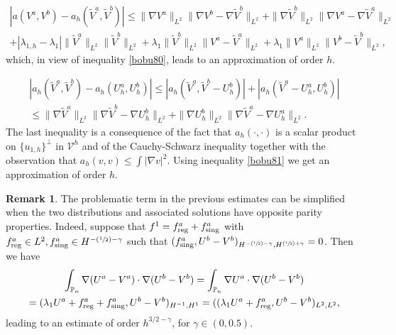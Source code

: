 \documentclass[JEP,XML,SOM,Unicode,ThmDefs,NoFloatCountersInSection,published]{cedram}
\newcommand{\Psfrac}[2]{(\sfrac{#1}{#2})}
\theoremstyle{plain}
\theoremstyle{definition}
\newtheorem{rem}[thm]{Remark}
\newcommand{\aaa}{a}
\newcommand{\bbb}{b}
\newcommand{\reg}{\textup{reg}}
\newcommand{\sing}{\textup{sing}}
\def\Pp{{\mathbb{P}_n}}
\newcommand{\lb}{\lambda}
\begin{document}
\vspace*{-1.8\baselineskip}
\begin{multline*}
|a(V^\aaa,V^\bbb)-a_h(\tilde V^\aaa, \tilde V^\bbb)| \le \|\nabla V^\aaa\|_{L^2} \|\nabla V^\bbb-\nabla \tilde V^\bbb\|_{L^2}+ \|\nabla \tilde V^\bbb\|_{L^2} \|\nabla V^\aaa-\nabla \tilde V^\aaa\|_{L^2}\\
+
|\lb_{1,h}-\lb_1| \|\tilde V^\aaa\|_{L^2}\|\tilde V^\bbb\|_{L^2}+ \lb_1 \|\tilde V^\bbb\|_{L^2} \| V^\aaa- \tilde V^\aaa\|_{L^2}+\lb_1 \|V^\aaa\|_{L^2} \| V^\bbb-\tilde V^\bbb\|_{L^2},
\end{multline*}
which, in view of inequality \eqref{bobu80}, leads to an approximation of order $h$.

\vspace*{-1.5\baselineskip}
\begin{multline*}
|a_h(\tilde V^\aaa, \tilde V^\bbb)-a_h(U_h^\aaa, U_h^\bbb)|\le |a_h(\tilde V^\aaa, \tilde V^\bbb-U^\bbb_h)|+ |a_h(\tilde V^\aaa-U^\aaa_h, U_h^\bbb)|\\
\le
\|\nabla \tilde V^\aaa\|_{L^2} \|\nabla \tilde V^\bbb-\nabla U^\bbb_h\|_{L^2}+ \|\nabla U^\bbb_h\|_{L^2} \|\nabla \tilde V^\aaa-\nabla U^\aaa_h\|_{L^2}.
\end{multline*}
The last inequality is a consequence of the fact that $a_h(\cdot, \cdot)$ is a scalar product on $\{u_{1,h}\}^\perp$ in ${\mathcal V}^h$ and of the Cauchy-Schwarz inequality together with the observation that $a_h(v,v) \le \int |\nabla v|^2$.
Using inequality \eqref{bobu81} we get an approximation of order $h$.

\begin{rem}
The problematic term in the previous estimates can be simplified when the two distributions and associated solutions have opposite parity properties. Indeed, suppose that $f^1 = f^\aaa_{\reg}+f^\aaa_{\sing}$ with $f^\aaa_{\reg} \in L^2, f^\aaa_{\sing} \in H^{-\Psfrac{1}{2}-\gamma}$ such that $(f^\aaa_{\sing},U^\bbb-V^\bbb)_{H^{-\Psfrac{1}{2}-\gamma},H^{\Psfrac{1}{2}+\gamma}} = 0$. Then we have
\vspace*{-5pt}
\begin{multline*}
\int_\Pp \nabla (U^\aaa-V^\aaa)\cdot \nabla (U^\bbb-V^\bbb) = \int_\Pp \nabla U^\aaa \cdot \nabla (U^\bbb-V^\bbb) \\
=  (\lambda_1U^\aaa+f^\aaa_{\reg}+f^\aaa_{\sing},U^\bbb-V^\bbb)_{H^{-1},H^1} = ((\lambda_1U^\aaa+f^\aaa_{\reg},U^\bbb-V^\bbb)_{L^2,L^2},
\end{multline*}
leading to an estimate of order $h^{3/2-\gamma}$, for $\gamma \in (0,0.5)$.
\label{rem:zero-singular-part}
\end{rem}
\end{document}
